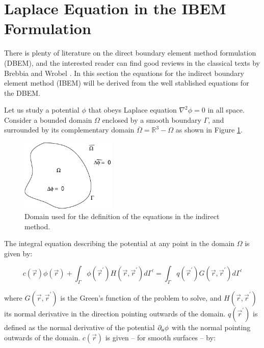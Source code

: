\documentclass[12pt]{report}
\begin{document}
\section{Laplace Equation in the IBEM Formulation}\label{sec_laplace}
There is plenty of literature on the direct boundary element method formulation (DBEM), and the interested reader can find good reviews in the classical texts by Brebbia \cite{Brebbia1978} and Wrobel \cite{Wrobel2002}. In this section the equations for the indirect boundary element method (IBEM) will be derived from the well stablished equations for the DBEM.

Let us study a potential $\phi$ that obeys Laplace equation $\nabla^2\phi=0$ in all space. Consider a bounded domain $\Omega$ enclosed by a smooth boundary $\Gamma$, and surrounded by its complementary domain $\overline{\Omega}=\mathbb{R}^3-\Omega$ as shown in Figure \ref{ibem_laplace_fig}.

\begin{figure}[hbt]
\begin{center}
\includegraphics[width=0.4\textwidth]{ibem_domain.pdf}
\end{center}
\caption{Domain used for the definition of the equations in the indirect method.}
\label{ibem_laplace_fig}
\end{figure}

The integral equation describing the potential at any point in the domain $\Omega$ is given by:

\begin{equation}c(\vec{r})\phi(\vec{r})+\int_\Gamma{\phi(\vec{r}^\prime)H(\vec{r},\vec{r}^\prime)d\Gamma^\prime}=\int_\Gamma{q(\vec{r}^\prime)G(\vec{r},\vec{r}^\prime)d\Gamma^\prime}\label{dbem_in}\end{equation}

where $G(\vec{r},\vec{r}^\prime)$ is the Green's function of the problem to solve, and $H(\vec{r},\vec{r}^\prime)$ its normal derivative in the direction pointing outwards of the domain. $q(\vec{r}^\prime)$ is defined as the normal derivative of the potential $\partial_{\rm{n}}\phi$ with the normal pointing outwards of the domain. $c(\vec{r})$ is given -- for smooth surfaces -- by:
\end{document}
